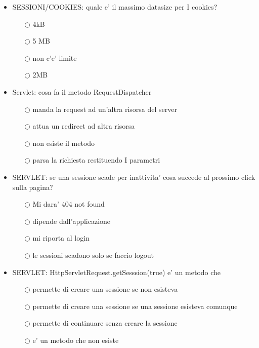 \documentclass[10pt,twocolumn]{article}
\begin{document}
\begin{itemize}
    \item SESSIONI/COOKIES: quale e' il massimo datasize per I cookies?
          \begin{itemize}
              \item[$\bigcirc$] 4kB
              \item[$\bigcirc$] 5 MB
              \item[$\bigcirc$] non c'e' limite
              \item[$\bigcirc$] 2MB
          \end{itemize}
\end{itemize}
\begin{itemize}
    \item Servlet: cosa fa il metodo RequestDispatcher
          \begin{itemize}
              \item[$\bigcirc$] manda la request ad un'altra risorsa del server
              \item[$\bigcirc$] attua un redirect ad altra risorsa
              \item[$\bigcirc$] non esiste il metodo
              \item[$\bigcirc$] parsa la richiesta restituendo I parametri
          \end{itemize}
\end{itemize}
\begin{itemize}
    \item SERVLET: se una sessione scade per inattivita' cosa succede al prossimo click sulla pagina?
          \begin{itemize}
              \item[$\bigcirc$] Mi dara' 404 not found
              \item[$\bigcirc$] dipende dall'applicazione
              \item[$\bigcirc$] mi riporta al login
              \item[$\bigcirc$] le sessioni scadono solo se faccio logout
          \end{itemize}
\end{itemize}
\begin{itemize}
    \item SERVLET: HttpServletRequest.getSesssion(true) e' un metodo che
          \begin{itemize}
              \item[$\bigcirc$] permette di creare una sessione se non esisteva
              \item[$\bigcirc$] permette di creare una sessione se una sessione esisteva comunque
              \item[$\bigcirc$] permette di continuare senza creare la sessione
              \item[$\bigcirc$] e' un metodo che non esiste
          \end{itemize}
\end{itemize}
\end{document}

